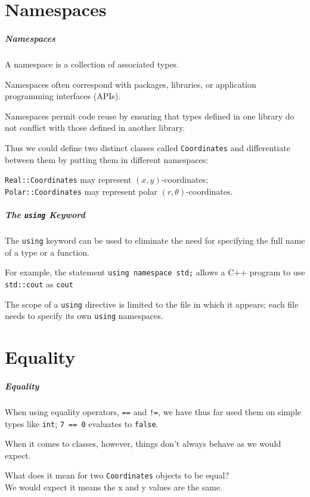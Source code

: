 \part{Namespaces}
\begin{frame}\partpage\end{frame}

\begin{frame}
\frametitle{Namespaces}
A \alert{namespace} is a collection of associated types.

Namespaces often correspond with packages, libraries, or application programming interfaces (APIs).

Namespaces permit code reuse by ensuring that types defined in one library do not conflict with those defined in another library.

Thus we could define two distinct classes called \texttt{Coordinates} and differentiate between them by putting them in different namespaces:

\texttt{Real::Coordinates} may represent $(x,y)$-coordinates;\\
\texttt{Polar::Coordinates} may represent polar $(r,\theta)$-coordinates.


\end{frame}

\begin{frame}
\frametitle{The \texttt{using} Keyword}

The \texttt{using} keyword can be used to eliminate the need for specifying the full name of a type or a function.

For example, the statement \texttt{using namespace std;} allows a C++ program to use \texttt{std::cout} as \texttt{cout}

The scope of a \texttt{using} directive is limited to the file in which it appears; each file needs to specify its own \texttt{using} namespaces.

\end{frame}

\part{Equality}
\begin{frame}\partpage\end{frame}

\begin{frame}
\frametitle{Equality}


When using equality operators, \texttt{==} and \texttt{!=}, we have thus far used them on simple types like \texttt{int}; \texttt{7 == 0} evaluates to \texttt{false}.

When it comes to classes, however, things don't always behave as we would expect.

What does it mean for two \texttt{Coordinates} objects to be equal?\\
\quad We would expect it means the x and y values are the same.

\end{frame}



